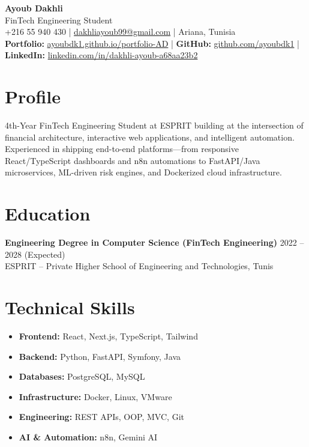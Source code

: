 \documentclass[a4paper,10pt]{article}
\begin{document}
\begin{center}
    {\LARGE \textbf{Ayoub Dakhli}} \\[3pt]
    {\large FinTech Engineering Student} \\[4pt]
    +216 55 940 430 \quad | \quad
    \href{mailto:dakhliayoub99@gmail.com}{dakhliayoub99@gmail.com} \quad | \quad
    Ariana, Tunisia \\[2pt]
    \textbf{Portfolio:} \href{https://ayoubdk1.github.io/portfolio-AD/}{ayoubdk1.github.io/portfolio-AD} \quad | \quad
    \textbf{GitHub:} \href{https://github.com/ayoubdk1}{github.com/ayoubdk1} \quad | \quad
    \textbf{LinkedIn:} \href{https://www.linkedin.com/in/dakhli-ayoub-a68aa23b2/}{linkedin.com/in/dakhli-ayoub-a68aa23b2}
\end{center}

\section*{Profile}
4th-Year FinTech Engineering Student at ESPRIT building at the intersection of financial architecture, interactive web applications, and intelligent automation. Experienced in shipping end-to-end platforms---from responsive React/TypeScript dashboards and n8n automations to FastAPI/Java microservices, ML-driven risk engines, and Dockerized cloud infrastructure.

\section*{Education}
\textbf{Engineering Degree in Computer Science (FinTech Engineering)} \hfill 2022 -- 2028 (Expected) \\
ESPRIT -- Private Higher School of Engineering and Technologies, Tunis

\section*{Technical Skills}
\begin{itemize}[leftmargin=*, noitemsep, topsep=2pt]
    \item \textbf{Frontend:} React, Next.js, TypeScript, Tailwind
    \item \textbf{Backend:} Python, FastAPI, Symfony, Java
    \item \textbf{Databases:} PostgreSQL, MySQL
    \item \textbf{Infrastructure:} Docker, Linux, VMware
    \item \textbf{Engineering:} REST APIs, OOP, MVC, Git
    \item \textbf{AI \& Automation:} n8n, Gemini AI
\end{itemize}
\end{document}
